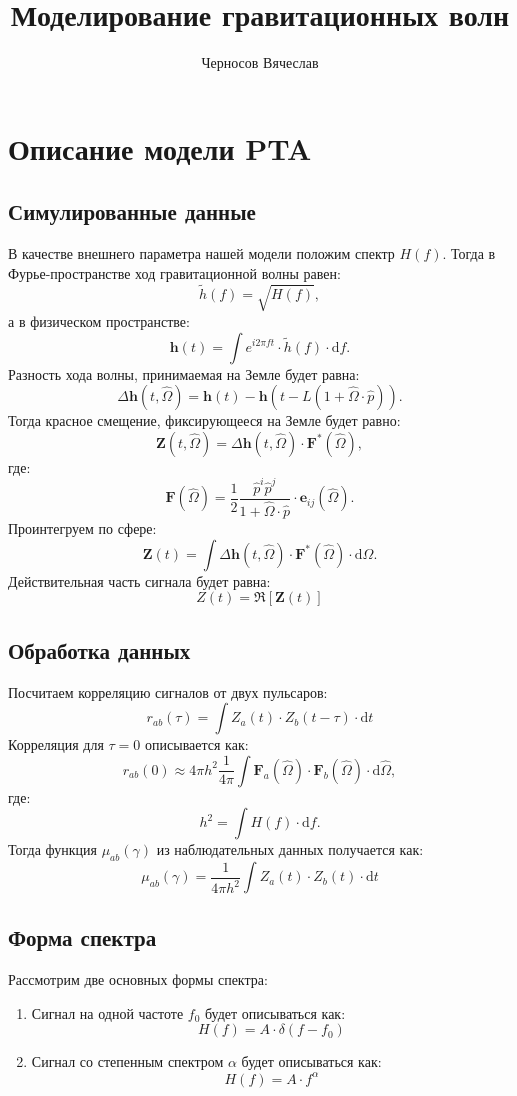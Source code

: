 
\author{Черносов Вячеслав}
\title{Моделирование гравитационных волн}


\maketitle
\section{Описание модели PTA}
\subsection{Симулированные данные}
В качестве внешнего параметра нашей модели положим спектр $H(f)$. Тогда в Фурье-пространстве ход гравитационной волны равен:
$$\tilde{h}(f) = \sqrt{H(f)},$$
а в физическом пространстве: 
$$\mathbf{h}(t) = \int e^{i 2 \pi f t} \cdot \tilde{h}(f) \cdot \mathrm{d} f.$$
Разность хода волны, принимаемая на Земле будет равна:
$$\Delta \mathbf{h}(t, \hat{\Omega}) = \mathbf{h}(t) - \mathbf{h}(t - L (1 + \hat{\Omega} \cdot \hat{p})).$$
Тогда красное смещение, фиксирующееся на Земле будет равно:
$$\mathbf{Z}(t, \hat{\Omega}) = \Delta \mathbf{h}(t, \hat{\Omega}) \cdot \mathbf{F}^{*}(\hat{\Omega}),$$
где:
$$\mathbf{F}(\hat{\Omega}) = \frac{1}{2} \frac{\hat{p}^i \hat{p}^j}{1 + \hat{\Omega} \cdot  \hat{p}} \cdot \mathbf{e}_{ij}(\hat{\Omega}).$$
Проинтегруем по сфере:
$$\mathbf{Z}(t) = \int   \Delta \mathbf{h}(t, \hat{\Omega}) \cdot \mathbf{F}^{*}(\hat{\Omega}) \cdot \mathrm{d} \hat{\Omega}.$$
Действительная часть сигнала будет равна:
$$Z(t) = \mathfrak{R}\left[\mathbf{Z}(t)\right]$$

\subsection{Обработка данных}
Посчитаем корреляцию сигналов от двух пульсаров:
$$ r_{ab} (\tau) = \int Z_a(t) \cdot Z_b(t - \tau) \cdot \mathrm{d} t $$
Корреляция для $\tau = 0$ описывается как:
$$r_{ab} (0) \approx 4 \pi h^2 \frac{1}{4 \pi} \int  \mathbf{F}_a(\hat{\Omega})  \cdot \mathbf{F}_b(\hat{\Omega}) \cdot \mathrm{d} \hat{\Omega},$$
где:
$$h^2 = \int H(f) \cdot \mathrm{d} f .$$
Тогда функция $\mu_{ab}(\gamma)$ из наблюдательных данных получается как:
$$\mu_{ab}(\gamma) = \frac{1}{4 \pi h^2} \int Z_a(t) \cdot Z_b(t) \cdot \mathrm{d} t$$
\subsection{Форма спектра}
Рассмотрим две основных формы спектра:
\begin{enumerate}
    \item  Сигнал на одной частоте $f_0$ будет описываться как:
    $$H(f) = A \cdot \delta(f - f_0)$$
    \item  Сигнал со степенным спектром $\alpha$ будет описываться как:
    $$H(f) = A \cdot f^{\alpha}$$
\end{enumerate} 
